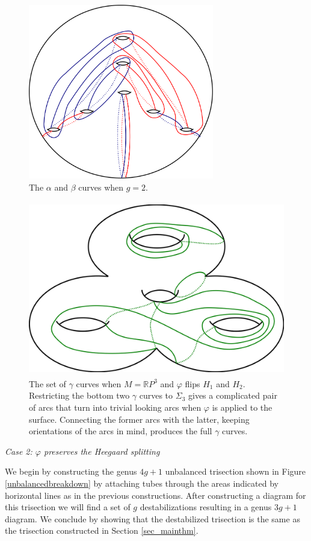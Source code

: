 \documentclass[12pt]{amsart}
\newcommand{\R}{\mathbb{R}}
\theoremstyle{definition}
\theoremstyle{remark}
\begin{document}
\begin{figure}[h]
\centering
\includegraphics[height=3in]{diagrampart1.png}
\caption{The $\alpha$ and $\beta$ curves when $g=2$.}
\label{firsttwocolors}
\end{figure}

\begin{figure}[h]
\centering
\includegraphics[height=3in]{s1rp3_green.png}
\caption{The set of $\gamma$ curves when $M =\R P^3$ and $\varphi$ flips $H_1$ and $H_2$.  Restricting the bottom two $\gamma$ curves to $\Sigma_3$ gives a complicated pair of arcs that turn into trivial looking arcs when $\varphi$ is applied to the surface.   Connecting the former arcs with the latter, keeping orientations of the arcs in mind, produces the full $\gamma$ curves.}
\label{greenex}
\end{figure}

\smallskip
\noindent\textit{Case 2: $\varphi$ preserves the Heegaard splitting}\ \ 

We begin by constructing the genus $4g+1$ unbalanced trisection shown in Figure \ref{unbalancedbreakdown} by attaching tubes through the areas indicated by horizontal lines as in the previous constructions.  After constructing a diagram for this trisection we will find a set of $g$ destabilizations resulting in a genus $3g+1$ diagram.  We conclude by showing that the destabilized trisection is the same as the trisection constructed in Section \ref{sec_mainthm}.  
\end{document}
